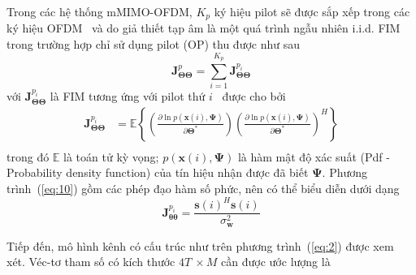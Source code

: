 Trong các hệ thống mMIMO-OFDM, $K_p$ ký hiệu pilot sẽ được sắp xếp trong các ký hiệu OFDM~\cite{Garro2020} và do giả thiết tạp âm là một quá trình ngẫu nhiên i.i.d. FIM trong trường hợp chỉ sử dụng pilot (OP) thu được như sau
\begin{equation}
\label{eq:9}
    \mathbf{J}_{\boldsymbol{\Theta} \boldsymbol{\Theta}}^{p}=\sum_{i=1}^{K_{p}} \mathbf{J}_{\boldsymbol{\Theta} \boldsymbol{\Theta}}^{p_{i}}
\end{equation}
với $\mathbf{J}_{\boldsymbol{\Theta} \boldsymbol{\Theta}}^{p_{i}}$ là FIM tương ứng với pilot thứ $i$~\cite{Kay1993} được cho bởi
\begin{equation}
    \label{eq:10}
    \begin{aligned}
        \mathbf{J}_{\boldsymbol{\Theta} \boldsymbol{\Theta}}^{p_{i}} &=\mathbb{E}\left\{\left(\frac{\partial \ln p(\mathbf{x}(i), \boldsymbol{\Psi})}{\partial \boldsymbol{\Theta}^{*}}\right)\left(\frac{\partial \ln p(\mathbf{x}(i), \boldsymbol{\Psi})}{\partial \boldsymbol{\Theta}^{*}}\right)^{H}\right\} \\
    \end{aligned}
\end{equation}
trong đó $\mathbb{E}$ là toán tử kỳ vọng; $p(\mathbf{x}(i), \boldsymbol{\Psi})$ là hàm mật độ xác suất (Pdf - Probability density function) của tín hiệu nhận được đã biết $\boldsymbol{\Psi}$. Phương trình~(\ref{eq:10}) gồm các phép đạo hàm số phức, nên có thể biểu diễn dưới dạng
\begin{equation}
    \mathbf{J}_{\boldsymbol{\theta} \mathbf{\theta}}^{p_{i}}=\frac{\mathbf{s}(i)^{H} \mathbf{s}(i)}{\sigma_{\mathbf{w}}^{2}}
\end{equation}

Tiếp đến, mô hình kênh có cấu trúc như trên phương trình~(\ref{eq:2}) được xem xét. Véc-tơ tham số có kích thước $4T~\times M$ cần được ước lượng là

